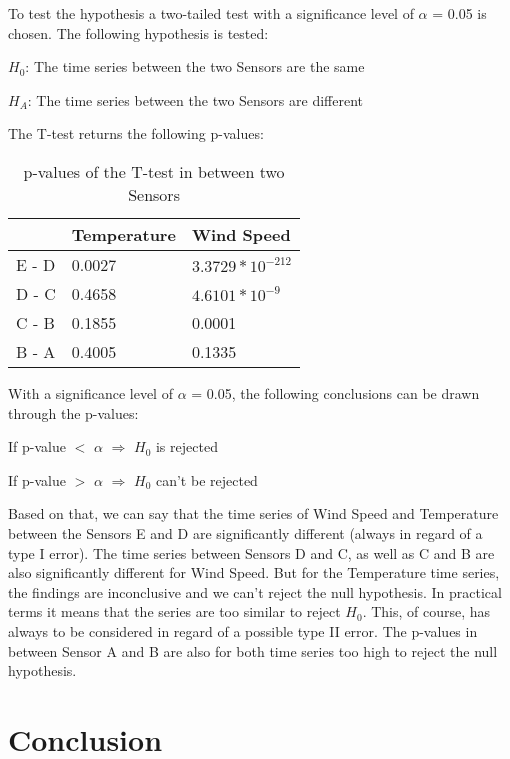 \documentclass{article}
\begin{document}
To test the hypothesis a two-tailed test with a significance level of $\alpha$ = 0.05 is chosen. The following hypothesis is tested:

\begin{center}
$H_0$: The time series between the two Sensors are the same

$H_A$: The time series between the two Sensors are different
\end{center}

\noindent The T-test returns the following p-values:

\begin{table}[H]
\centering
\begin{tabular}{l|ll}
      & Temperature & Wind Speed      \\ \hline
E - D & 0.0027      & $3.3729 * 10^{-212}$ \\
D - C & 0.4658      & $4.6101 * 10^{-9}$   \\
C - B & 0.1855      & 0.0001          \\
B - A & 0.4005      & 0.1335         
\end{tabular}
\caption{p-values of the T-test in between two Sensors}
\label{tab:my-table}
\end{table}

\noindent With a significance level of $\alpha$ = 0.05, the following conclusions can be drawn through the p-values:

\begin{center}
If p-value $<$ $\alpha$ $\Rightarrow$ $H_0$ is rejected

If p-value $>$ $\alpha$ $\Rightarrow$ $H_0$ can’t be rejected
\end{center}


\noindent Based on that, we can say that the time series of Wind Speed and Temperature between the Sensors E and D are significantly different (always in regard of a type I error). The time series between Sensors D and C, as well as C and B are also significantly different for Wind Speed. But for the Temperature time series, the findings are inconclusive and we can’t reject the null hypothesis. In practical terms it means that the series are too similar to reject $H_0$. This, of course, has always to be considered in regard of a possible type II error. The p-values in between Sensor A and B are also for both time series too high to reject the null hypothesis. 

\section{Conclusion}
\end{document}
